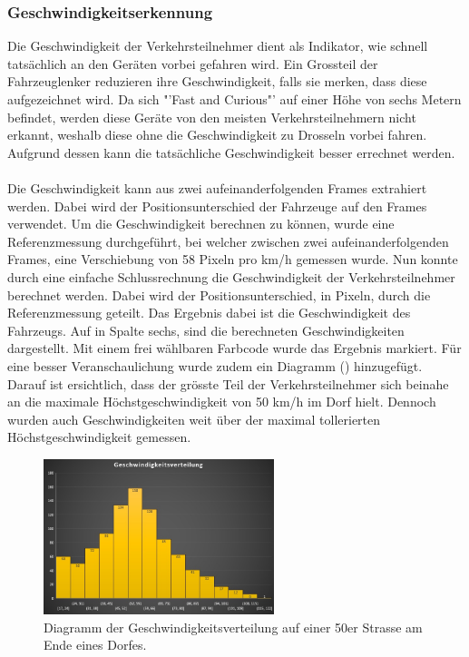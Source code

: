 \subsubsection{Geschwindigkeitserkennung}
Die Geschwindigkeit der Verkehrsteilnehmer dient als Indikator, wie schnell tatsächlich an den Geräten vorbei gefahren wird. Ein Grossteil der Fahrzeuglenker reduzieren ihre Geschwindigkeit, falls sie merken, dass diese aufgezeichnet wird. Da sich "'Fast and Curious"' auf einer Höhe von sechs Metern befindet, werden diese Geräte von den meisten Verkehrsteilnehmern nicht erkannt, weshalb diese ohne die Geschwindigkeit zu Drosseln vorbei fahren. Aufgrund dessen kann die tatsächliche Geschwindigkeit besser errechnet werden.\\\\
Die Geschwindigkeit kann aus zwei aufeinanderfolgenden Frames extrahiert werden. Dabei wird der Positionsunterschied der Fahrzeuge auf den Frames verwendet. Um die Geschwindigkeit berechnen zu können, wurde eine Referenzmessung durchgeführt, bei welcher zwischen zwei aufeinanderfolgenden Frames, eine Verschiebung von 58 Pixeln pro km/h gemessen wurde. Nun konnte durch eine einfache Schlussrechnung die Geschwindigkeit der Verkehrsteilnehmer berechnet werden. Dabei wird der Positionsunterschied, in Pixeln, durch die Referenzmessung geteilt. Das Ergebnis dabei ist die Geschwindigkeit des Fahrzeugs. Auf  in Spalte sechs, sind die berechneten Geschwindigkeiten dargestellt. Mit einem frei wählbaren Farbcode wurde das Ergebnis markiert. Für eine besser Veranschaulichung wurde zudem ein Diagramm () hinzugefügt. Darauf ist ersichtlich, dass der grösste Teil der Verkehrsteilnehmer sich beinahe an die maximale Höchstgeschwindigkeit von  50 km/h  im Dorf hielt. Dennoch wurden auch Geschwindigkeiten weit über der maximal tollerierten Höchstgeschwindigkeit gemessen.

\begin{figure}[H]
  \centering
  \includegraphics[width=0.6\textwidth]{Resultate/GeschwDiagramm.jpg} 
  \caption{Diagramm der Geschwindigkeitsverteilung auf einer 50er Strasse am Ende eines Dorfes.}
  \label{bGeschwDiagramm}
\end{figure}


